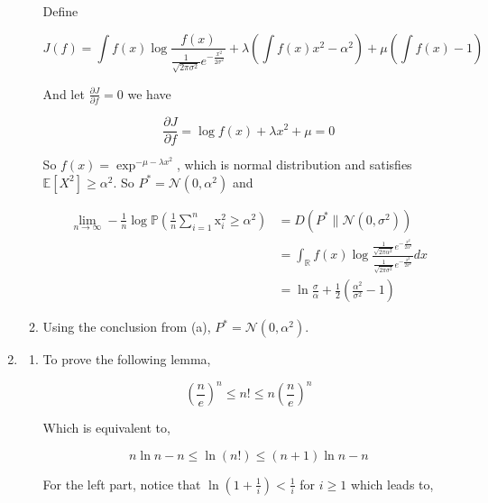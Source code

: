 \documentclass[a4paper]{article}
\begin{document}
\begin{enumerate}
\begin{enumerate}
Define 

\begin{equation}
  J(f) = \int f(x) \log{\frac{f(x)}{\frac{1}{\sqrt{2\pi \sigma^2}}e^{-\frac{x^2}{2\sigma^2}}} } + \lambda (\int f(x) x^2  - \alpha^2) + \mu(\int f(x) -1)
\end{equation}


And let $\frac{\partial J}{\partial f} = 0$ we have 

\begin{equation}
  \frac{\partial J}{\partial f} = \log f(x)  + \lambda x^2 + \mu = 0
\end{equation}

So $f(x) = \exp^{-\mu -\lambda x^2}$, which is normal distribution and satisfies $\mathbb{E}[X^2] \geqslant \alpha^2$. So $P^* = \mathcal{N}(0,\alpha^2)$ and 

\begin{equation}
  \begin{aligned}
    \lim_{n \to \infty}-\frac{1}{n} \log \mathbb{P}(\frac{1}{n} \sum_{i=1}^n \mathrm{x}_i^2 \geqslant \alpha^2) & =  D(P^*\| \mathcal{N}(0,\sigma^2))  \\& = \int_{\mathbb{R}} f(x) \log{\frac{\frac{1}{\sqrt{2\pi \alpha^2}}e^{-\frac{x^2}{2\alpha^2}}}{\frac{1}{\sqrt{2\pi \sigma^2}}e^{-\frac{x^2}{2\sigma^2}}} dx} \\
    & = \ln \frac{\sigma}{\alpha} + \frac{1}{2}(\frac{\alpha^2}{\sigma^2}-1)
  \end{aligned}
\end{equation}

\item Using the conclusion from (a), $P^* = \mathcal{N}(0,\alpha^2)$.

\end{enumerate}

\item \begin{enumerate}
  \item To prove the following lemma, 

\begin{equation}
  \left(\frac{n}{e}\right)^{n} \leqslant n ! \leqslant n\left(\frac{n}{e}\right)^{n}
\end{equation}

Which is equivalent to,

\begin{equation}
  n\ln n - n \leqslant \ln(n!) \leqslant (n+1)\ln n - n
\end{equation}

For the left part, notice that $\ln(1+\frac 1 {i})< \frac{1}{i}$ for $i\geqslant 1$ which leads to,


\end{enumerate}
\end{enumerate}
\end{document}
